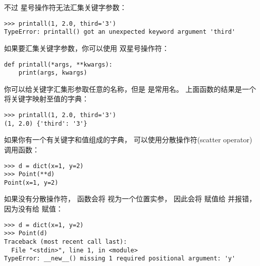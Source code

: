 
不过 \li{*} 星号操作符无法汇集关键字参数：

\begin{lstlisting}
>>> printall(1, 2.0, third='3')
TypeError: printall() got an unexpected keyword argument 'third'
\end{lstlisting}


如果要汇集关键字参数，你可以使用 \li{**} 双星号操作符：

\begin{lstlisting}
def printall(*args, **kwargs):
    print(args, kwargs)
\end{lstlisting}


你可以给关键字汇集形参取任意的名称，但是  是常用名。
上面函数的结果是一个将关键字映射至值的字典：

\begin{lstlisting}
>>> printall(1, 2.0, third='3')
(1, 2.0) {'third': '3'}
\end{lstlisting}


如果你有一个有关键字和值组成的字典， 可以使用分散操作符(scatter operator) \li{**} 调用函数：

\begin{lstlisting}
>>> d = dict(x=1, y=2)
>>> Point(**d)
Point(x=1, y=2)
\end{lstlisting}


如果没有分散操作符， 函数会将  视为一个位置实参， 因此会将  赋值给  并报错， 因为没有给  赋值：

\begin{lstlisting}
>>> d = dict(x=1, y=2)
>>> Point(d)
Traceback (most recent call last):
  File "<stdin>", line 1, in <module>
TypeError: __new__() missing 1 required positional argument: 'y'
\end{lstlisting}

